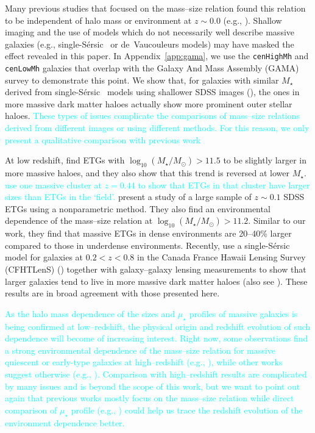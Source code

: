 \documentclass[a4paper,fleqn,usenatbib]{mnras}
\def\ser{{S\'{e}rsic\ }}
\def\rbcg{\texttt{cenHighMh}}
\def\nbcg{\texttt{cenLowMh}}
\def\mstar{{$M_{\star}$}}
\def\logms{{$\log_{10} (M_{\star}/M_{\odot})$}}
\def\mden{{$\mu_{\star}$}}
\newcommand{\song}[1]{\textcolor{cyan}{#1}}
\begin{document}
    Many previous studies that focused on the mass--size relation found this relation 
    to be independent of halo mass or environment at $z\sim 0.0$ 
    (e.g., \citealt{Nair2010, Maltby2010, Cappellari2013, HCompany13}). 
    Shallow imaging and the use of models which do not necessarily well describe 
    massive galaxies (e.g., single-\ser{} or de~Vaucouleurs models) may have masked 
    the effect revealed in this paper. 
    In Appendix~\ref{app:gama}, we use the \rbcg{} and \nbcg{} galaxies that overlap 
    with the Galaxy And Mass Assembly (GAMA) survey to demonstrate this point. 
    We show that, for galaxies with similar \mstar{} derived from single-\ser{} 
    models using shallower SDSS images (\citealt{Kelvin2012}), the ones in more 
    massive dark matter haloes actually show more prominent outer stellar haloes.
    \song{These types of issues complicate the comparisons of mass--size relations 
    derived from different images or using different methods. 
    For this reason, we only present a qualitative comparison with previous work}
    
    At low redshift, \citet{Cerbrian2014} find ETGs with \logms{}$>11.5$ to be slightly 
    larger in more massive haloes, and they also show that this trend is reversed at 
    lower \mstar{}. 
    \song{
    \citet{Kuchner2017} use one massive cluster at $z=0.44$ to show that ETGs in 
    that cluster have larger sizes than ETGs in the `field'. 
    }
    \citet{Yoon2017} present a study of a large sample of $z\sim0.1$ SDSS ETGs using 
    a nonparametric method. 
    They also find an environmental dependence of the mass--size relation at 
    \logms{}$>11.2$. 
    Similar to our work, they find that massive ETGs in dense environments are 
    20--40\% larger compared to those in underdense environments.
    Recently, \citet{Charlton2017} use a single-\ser{} model for galaxies at 
    $0.2 < z < 0.8$ in the Canada France Hawaii Lensing Survey (CFHTLenS) 
    (\citealt{Heymans2012}) together with galaxy--galaxy lensing measurements to 
    show that larger galaxies tend to live in more massive dark matter haloes 
    (also see \citealt{Sonnenfeld2017}).
    These results are in broad agreement with those presented here.
    
    \song{
    As the halo mass dependence of the sizes and \mden{} profiles of massive 
    galaxies is being confirmed at low--redshift, the physical origin and 
    redshift evolution of such dependence will become of increasing interest.  
    Right now, some observations find a strong environmental dependence of the 
    mass--size relation for massive quiescent or early-type galaxies at 
    high--redshift (e.g., \citealt{Papovich2012, Bassett2013, Lani2013, 
    Strazzullo2013, Delaye2014}), while other works suggest otherwise (e.g., 
    \citealt{Rettura2010, Raichoor2012, Kelkar2015, Allen2015}). 
    Comparison with high--redshift results are complicated by many issues and 
    is beyond the scope of this work, but we want to point out again that 
    previous works mostly focus on the mass--size relation while direct comparison 
    of \mden{} profile (e.g., \citealt{Szomoru2012, Patel2013, Buitrago2017, 
    Hill2017}) could help us trace the redshift evolution of the environment 
    dependence better. 
    }
    
\end{document}
